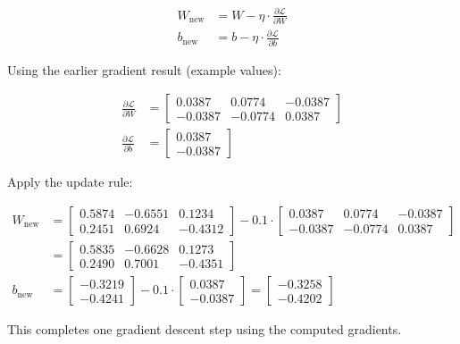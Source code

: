 \begin{align}
	W_{\text{new}} &= W - \eta \cdot \frac{\partial \mathcal{L}}{\partial W} \\
	b_{\text{new}} &= b - \eta \cdot \frac{\partial \mathcal{L}}{\partial b}
\end{align}

Using the earlier gradient result (example values):

\begin{align}
	\frac{\partial \mathcal{L}}{\partial W} &=
	\begin{bmatrix}
		0.0387 & 0.0774 & -0.0387 \\
		-0.0387 & -0.0774 & 0.0387
	\end{bmatrix} \\[6pt]
	\frac{\partial \mathcal{L}}{\partial b} &=
	\begin{bmatrix}
		0.0387 \\
		-0.0387
	\end{bmatrix}
\end{align}

Apply the update rule:

\begin{align}
	W_{\text{new}} &= 
	\begin{bmatrix}
		0.5874 & -0.6551 & 0.1234 \\
		0.2451 &  0.6924 & -0.4312
	\end{bmatrix}
	-
	0.1 \cdot
	\begin{bmatrix}
		0.0387 & 0.0774 & -0.0387 \\
		-0.0387 & -0.0774 & 0.0387
	\end{bmatrix} \\[6pt]
	&=
	\begin{bmatrix}
		0.5835 & -0.6628 & 0.1273 \\
		0.2490 &  0.7001 & -0.4351
	\end{bmatrix} \\[12pt]
	b_{\text{new}} &= 
	\begin{bmatrix}
		-0.3219 \\
		-0.4241
	\end{bmatrix}
	-
	0.1 \cdot
	\begin{bmatrix}
		0.0387 \\
		-0.0387
	\end{bmatrix}
	=
	\begin{bmatrix}
		-0.3258 \\
		-0.4202
	\end{bmatrix}
\end{align}

This completes one gradient descent step using the computed gradients.


